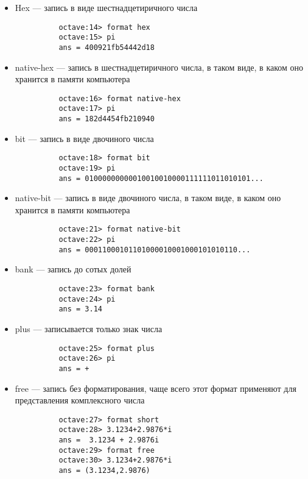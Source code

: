 \documentclass[12pt, a4paper,oneside]{book}
\begin{document}
\begin{itemize}
  \item{Hex --- запись в виде шестнадцетиричного числа}
        \begin{lstlisting}
          octave:14> format hex
          octave:15> pi
          ans = 400921fb54442d18
        \end{lstlisting}

  \item{native-hex --- запись в шестнадцетиричного числа, в таком виде, в каком оно хранится в памяти компьютера}
        \begin{lstlisting}
          octave:16> format native-hex
          octave:17> pi
          ans = 182d4454fb210940
        \end{lstlisting}

  \item{bit --- запись в виде двочиного числа}
        \begin{lstlisting}
          octave:18> format bit
          octave:19> pi
          ans = 01000000000010010010000111111011010101...
        \end{lstlisting}

  \item{native-bit --- запись в виде двочиного числа, в таком виде, в каком оно хранится в памяти компьютера}
        \begin{lstlisting}
          octave:21> format native-bit
          octave:22> pi
          ans = 00011000101101000010001000101010110...
        \end{lstlisting}

  \item{bank --- запись до сотых долей}
        \begin{lstlisting}
          octave:23> format bank
          octave:24> pi
          ans = 3.14
        \end{lstlisting}

  \item{plus --- записывается только знак числа}
        \begin{lstlisting}
          octave:25> format plus
          octave:26> pi
          ans = +
        \end{lstlisting}

  \item{free --- запись без форматирования, чаще всего этот формат применяют для представления комплексного числа}
        \begin{lstlisting}
          octave:27> format short
          octave:28> 3.1234+2.9876*i
          ans =  3.1234 + 2.9876i
          octave:29> format free
          octave:30> 3.1234+2.9876*i
          ans = (3.1234,2.9876)
        \end{lstlisting}


\end{itemize}
\end{document}
